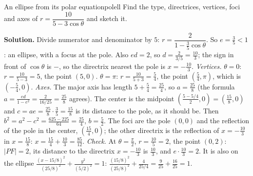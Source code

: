 \documentclass[11pt]{article}
\begin{document}
\begin{exmp}{An ellipse from its polar equation}{polell}
Find the type, directrices, vertices, foci and axes of $r=\dfrac{10}{5-3\cos\theta}$ and sketch it.

\textbf{Solution.} Divide numerator and denominator by $5$: $r=\dfrac{2}{1-\frac35\cos\theta}$. So $e=\frac35<1$: an ellipse, with a focus at the pole. Also $ed=2$, so $d=\frac{2}{3/5}=\frac{10}3$; the sign in front of $\cos\theta$ is $-$, so the directrix nearest the pole is $x=-\frac{10}3$. \emph{Vertices.} $\theta=0$: $r=\frac{10}{5-3}=5$, the point $(5,0)$. $\theta=\pi$: $r=\frac{10}{5+3}=\frac54$, the point $\left(\frac54,\pi\right)$, which is $\left(-\frac54,0\right)$. \emph{Axes.} The major axis has length $5+\frac54=\frac{25}4$, so $a=\frac{25}8$ (the formula $a=\frac{ed}{1-e^2}=\frac{2}{16/25}=\frac{25}8$ agrees). The center is the midpoint $\left(\frac{5-5/4}{2},0\right)=\left(\frac{15}8,0\right)$ and $c=ae=\frac{25}8\cdot\frac35=\frac{15}8$ is its distance to the pole, as it should be. Then $b^2=a^2-c^2=\frac{625-225}{64}=\frac{25}4$, $b=\frac52$. The foci are the pole $(0,0)$ and the reflection of the pole in the center, $\left(\frac{15}4,0\right)$; the other directrix is the reflection of $x=-\frac{10}3$ in $x=\frac{15}8$: $x=\frac{15}4+\frac{10}3=\frac{85}{12}$.
\emph{Check.} At $\theta=\frac\pi2$, $r=\frac{10}5=2$, the point $(0,2)$: $\lvert PF\rvert=2$, its distance to the directrix $x=-\frac{10}3$ is $\frac{10}3$, and $e\cdot\frac{10}3=2$. It is also on the ellipse $\frac{(x-15/8)^2}{(25/8)^2}+\frac{y^2}{(5/2)^2}=1$: $\frac{(15/8)^2}{(25/8)^2}+\frac{4}{25/4}=\frac9{25}+\frac{16}{25}=1$.


\end{exmp}
\end{document}
